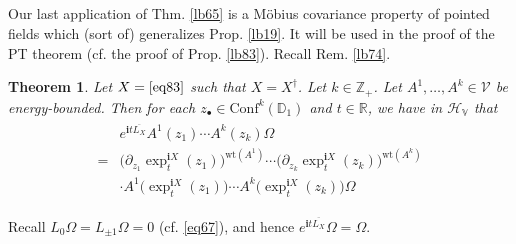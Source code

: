 \documentclass[12pt,b5paper,notitlepage]{article}
\theoremstyle{definition}
\theoremstyle{plain}
\newtheorem{thm}[df]{Theorem}
\newcommand{\mc}{\mathcal}
\newcommand{\ovl}{\overline}
\newcommand{\Conf}{\mathrm{Conf}}
\newcommand{\im}{\mathbf{i}}
\newcommand{\blt}{\bullet}
\newcommand{\Zbb}{\mathbb Z}
\newcommand{\Rbb}{\mathbb R}
\newcommand{\Dbb}{\mathbb D}
\newcommand{\wt}{\mathrm{wt}}
\newcommand{\HV}{\mathcal H_{\mathbb V}}
\numberwithin{equation}{section}
\begin{document}
\subsection{}

Our last application of Thm. \ref{lb65} is a M\"obius covariance property of pointed fields which (sort of) generalizes Prop. \ref{lb19}. It will be used in the proof of the PT theorem (cf. the proof of Prop. \ref{lb83}). Recall Rem. \ref{lb74}. 




\begin{thm}\label{lb80}
Let $X=\eqref{eq83}$ such that $X=X^\dagger$. Let $k\in\Zbb_+$. Let $A^1,\dots,A^k\in\mc V$ be energy-bounded. Then for each  $z_\blt\in\Conf^k(\Dbb_1)$ and $t\in\Rbb$, we have in $\HV$ that
\begin{align}\label{eq94}
\begin{aligned}
&e^{\im t\ovl{L_X}}A^1(z_1)\cdots A^k(z_k)\Omega\\
=&\big(\partial_{z_1}\exp^{\im X}_t(z_1)\big)^{\wt(A^1)}\cdots \big(\partial_{z_k}\exp^{\im X}_t(z_k)\big)^{\wt(A^k)}\\
&\cdot A^1\big(\exp^{\im X}_t(z_1)\big)\cdots A^k\big(\exp^{\im X}_t(z_k)\big)\Omega
\end{aligned}
\end{align}
\end{thm}


Recall $L_0\Omega=L_{\pm 1}\Omega=0$ (cf. \eqref{eq67}), and hence $e^{\im t\ovl{L_X}}\Omega=\Omega$.
\end{document}

